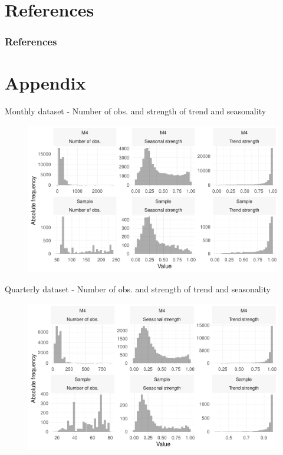 \documentclass[aspectratio=169]{beamer}
\begin{document}
\section{References}

\begin{frame}[allowframebreaks]
    \frametitle{References}
    \nocite{*}
    \printbibliography[heading=none]
\end{frame}


\section{Appendix}




\begin{frame}[t]{Monthly dataset - Number of obs. and strength of trend and seasonality}
	\begin{figure}[H]
    \center
		\includegraphics[scale=0.7]{figures/figure_01_data_monthly.pdf}
	\end{figure}
\end{frame}


\begin{frame}[t]{Quarterly dataset - Number of obs. and strength of trend and seasonality}
	\begin{figure}[H]
    \center
		\includegraphics[scale=0.7]{figures/figure_02_data_quarterly.pdf}
	\end{figure}
\end{frame}
\end{document}
